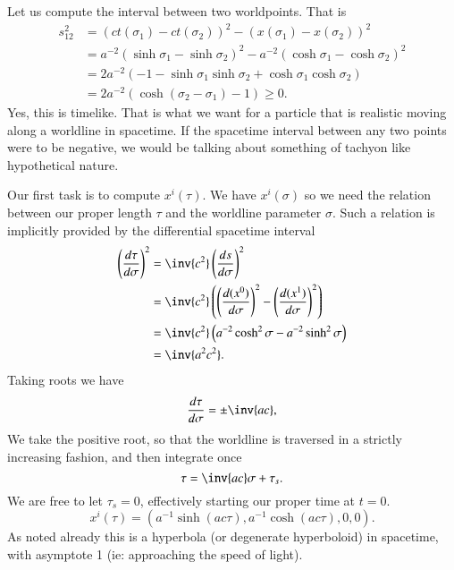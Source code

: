 {Let us compute the interval between two worldpoints.  That is
%
\begin{equation}\label{eqn:relativisticElectrodynamicsT2:2100}
\begin{aligned}
s_{12}^2
&= (ct(\sigma_1) - ct(\sigma_2))^2 - (x(\sigma_1) - x(\sigma_2))^2  \\
&= a^{-2} (\sinh \sigma_1 - \sinh \sigma_2)^2 - a^{-2} (\cosh\sigma_1 - \cosh\sigma_2)^2 \\
&= 2 a^{-2} \left( -1 - \sinh\sigma_1 \sinh \sigma_2 + \cosh\sigma_1 \cosh\sigma_2 \right) \\
&= 2 a^{-2} \left( \cosh( \sigma_2 - \sigma_1) -1 \right) \ge 0.
\end{aligned}
\end{equation}
%
Yes, this is timelike.  That is what we want for a particle that is realistic moving along a worldline in spacetime.  If the spacetime interval between any two points were to be negative, we would be talking about something of tachyon like hypothetical nature.

%
%
Our first task is to compute \(x^i(\tau)\).  We have \(x^i(\sigma)\) so we need the relation between our proper length \(\tau\) and the worldline parameter \(\sigma\).  Such a relation is implicitly provided by the differential spacetime interval
%
\begin{equation}\label{eqn:relativisticElectrodynamicsT2:2120}
\begin{aligned}
\left(\frac{d\tau}{d\sigma}\right)^2
&= \inv{c^2} \left(\frac{ds}{d\sigma}\right)^2 \\
&= \inv{c^2} \left(
\left( \frac{d(x^0)}{d\sigma}\right)^2
-\left( \frac{d(x^1)}{d\sigma}\right)^2
\right) \\
&= \inv{c^2} \left( a^{-2} \cosh^2 \sigma - a^{-2} \sinh^2 \sigma \right) \\
&= \inv{a^2 c^2}.
\end{aligned}
\end{equation}
Taking roots we have
\begin{equation}\label{eqn:relativisticElectrodynamicsT2:50}
\frac{d\tau}{d\sigma} = \pm \inv{a c},
\end{equation}
%
We take the positive root, so that the worldline is traversed in a strictly increasing fashion, and then integrate once
%
\begin{equation}\label{eqn:relativisticElectrodynamicsT2:60}
\tau = \inv{ac} \sigma + \tau_s.
\end{equation}
%
We are free to let \(\tau_s = 0\), effectively starting our proper time at \(t=0\).
%
\begin{equation}\label{eqn:relativisticElectrodynamicsT2:70}
x^i(\tau) = ( a^{-1} \sinh( a c \tau), a^{-1} \cosh( a c \tau ), 0, 0 ).
\end{equation}
%
As noted already this is a hyperbola (or degenerate hyperboloid) in spacetime, with asymptote 1 (ie: approaching the speed of light).

}
